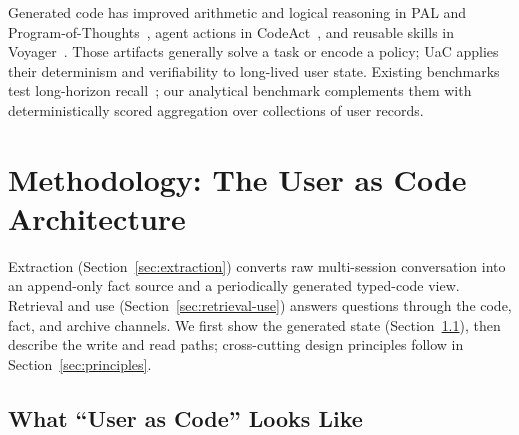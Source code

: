\documentclass[letterpaper]{article} %
\begin{document}
Generated code has improved arithmetic and logical reasoning in PAL and Program-of-Thoughts~\citep{gao2023pal,chen2023pot}, agent actions in CodeAct~\citep{wang2024codeact}, and reusable skills in Voyager~\citep{wang2024voyager}. Those artifacts generally solve a task or encode a policy; UaC applies their determinism and verifiability to long-lived user state. Existing benchmarks test long-horizon recall~\citep{maharana2024locomo,wu2025longmemeval}; our analytical benchmark complements them with deterministically scored aggregation over collections of user records.


\section{Methodology: The User as Code Architecture}
\label{sec:method}

Extraction (Section~\ref{sec:extraction}) converts raw multi-session conversation into an append-only fact source and a periodically generated typed-code view. Retrieval and use (Section~\ref{sec:retrieval-use}) answers questions through the code, fact, and archive channels. We first show the generated state (Section~\ref{sec:code-example}), then describe the write and read paths; cross-cutting design principles follow in Section~\ref{sec:principles}.

\subsection{What ``User as Code'' Looks Like}
\label{sec:code-example}
\end{document}
